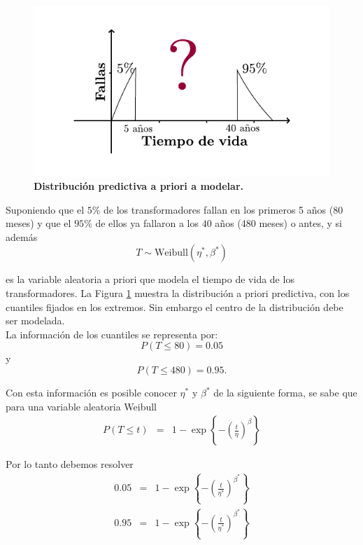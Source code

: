 \begin{figure}
\begin{center}
\includegraphics[scale=1]{apriori1.pdf}
\end{center}
\vspace{-1.5 cm}\caption{\bf Distribuci\'on predictiva a priori a modelar.}\label{dos}
\end{figure}

\noindent  Suponiendo que el $5\%$ de los transformadores fallan en los primeros 5 a\~nos (80 meses) y  que el $95\%$ de ellos ya fallaron a los $40$ a\~nos (480 meses) o antes, y 
si adem\'as $$T\sim \text{Weibull}(\eta^{*},\beta^{*})$$ 


\noindent es la variable aleatoria a priori que modela el tiempo de vida de los transformadores. La Figura \ref{dos} muestra la distribuci\'on a priori predictiva, con los cuantiles fijados en los extremos. Sin embargo el centro de la distribuci\'on debe ser modelada.\\[0.1cm]
\noindent La informaci\'on de los cuantiles se representa por:
$$P(T\leq 80)=0.05$$
y 
$$P(T\leq 480)=0.95.$$

\noindent Con esta informaci\'on es posible conocer  $\eta^{*}$ y  $\beta^{*}$  de la siguiente forma, se sabe que para una variable aleatoria Weibull
\begin{eqnarray*}
P(T\leq t) &=& 1-\exp\left\{-\left(\frac{t}{\eta}\right)^{\beta}\right\}
\end{eqnarray*}

Por lo tanto debemos resolver
\begin{eqnarray*}
0.05 &=& 1-\exp\left\{-\left(\frac{t}{\eta^{*}}\right)^{\beta^{*}}\right\}\\
0.95 &=& 1-\exp\left\{-\left(\frac{t}{\eta^{*}}\right)^{\beta^{*}}\right\}\\
\end{eqnarray*}

